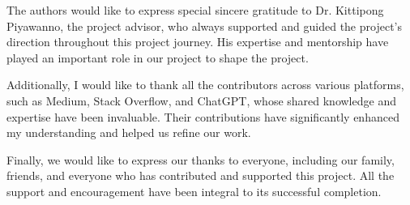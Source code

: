 \documentclass[12pt,oneside,openright,a4paper]{cpe-english-project}
\begin{document}
\preface
The authors would like to express special sincere gratitude to Dr. Kittipong Piyawanno, the project advisor,
who always supported and guided the project's direction throughout this project journey. His expertise and mentorship have played an important role in our project to shape the project. \par
Additionally, I would like to thank all the contributors across various platforms, such as Medium, Stack Overflow, and ChatGPT, whose shared knowledge and expertise have been invaluable. Their contributions have significantly enhanced my understanding and helped us refine our work. \par
Finally, we would like to express our thanks to everyone, including our family, friends, and everyone who has contributed and supported this project. All the support and encouragement have been integral to its successful completion.

\tableofcontents
                    
\listoftables
\end{document}
